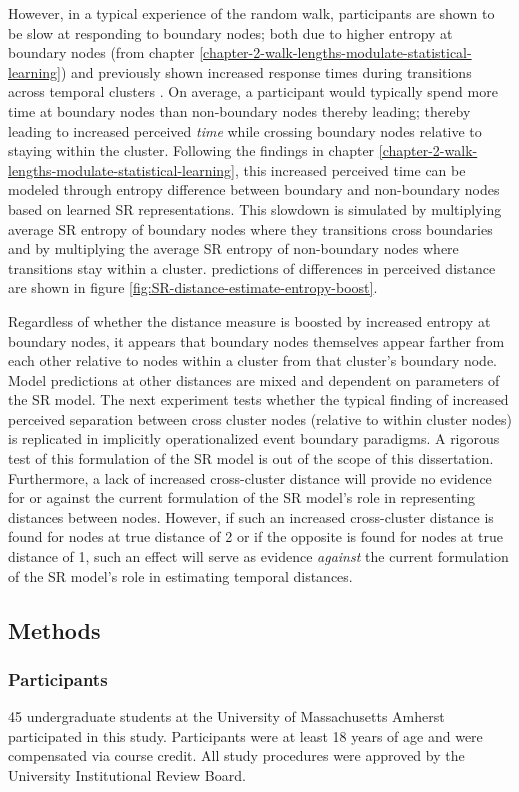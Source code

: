 However, in a typical experience of the random walk, participants are shown to be slow at responding to boundary nodes; both due to higher entropy at boundary nodes (from chapter \ref{chapter-2-walk-lengths-modulate-statistical-learning}) and previously shown increased response times during transitions across temporal clusters \cite{lynn2020abstract,kahn2018network}. On average, a participant would typically spend more time at boundary nodes than non-boundary nodes thereby leading; thereby leading to increased perceived \textit{time} while crossing boundary nodes relative to staying within the cluster. Following the findings in chapter \ref{chapter-2-walk-lengths-modulate-statistical-learning}, this increased perceived time can be modeled through entropy difference between boundary and non-boundary nodes based on learned SR representations. This slowdown is simulated by multiplying average SR entropy of boundary nodes where they transitions cross boundaries and by multiplying the average SR entropy of non-boundary nodes where transitions stay within a cluster. predictions of differences in perceived distance are shown in figure \ref{fig:SR-distance-estimate-entropy-boost}.


Regardless of whether the distance measure is boosted by increased entropy at boundary nodes, it appears that boundary nodes themselves appear farther from each other relative to nodes within a cluster from that cluster's boundary node. Model predictions at other distances are mixed and dependent on parameters of the SR model. The next experiment tests whether the typical finding of increased perceived separation between cross cluster nodes (relative to within cluster nodes) is replicated in implicitly operationalized event boundary paradigms. A rigorous test of this formulation of the SR model is out of the scope of this dissertation. Furthermore, a lack of increased cross-cluster distance will provide no evidence for or against the current formulation of the SR model's role in representing distances between nodes. However, if such an increased cross-cluster distance is found for nodes at true distance of 2 or if the opposite is found for nodes at true distance of 1, such an effect will serve as evidence \textit{against} the current formulation of the SR model's role in estimating temporal distances. 

\subsection{Methods}
\subsubsection*{Participants}
45 undergraduate students at the University of Massachusetts Amherst participated in this study. Participants were at least 18 years of age and were compensated via course credit. All study procedures were approved by the University Institutional Review Board. 

